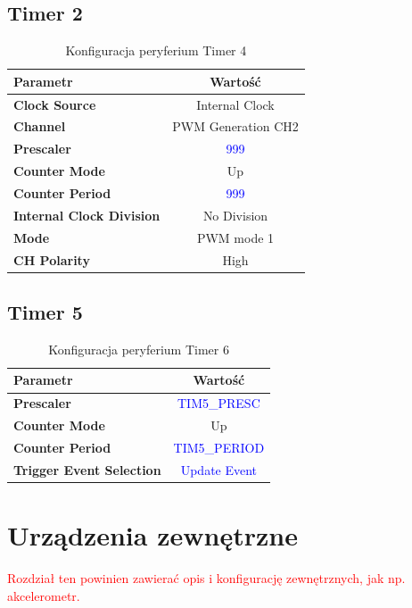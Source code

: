 \documentclass[10pt, a4paper]{article}
\begin{document}
\subsection{Timer 2}

\begin{table}[H]
	\centering
	\begin{tabular}{|l|c|} \hline
		\textbf{Parametr} & Wartość \\
		\hline
		\hline  \textbf{Clock Source}&Internal Clock  \\\hline
		\textbf{Channel} & PWM Generation CH2\\\hline
		\textbf{Prescaler} & \textcolor{blue}{999}\\\hline
		\textbf{Counter Mode} &  Up\\
		\hline
		\textbf{Counter Period}& \textcolor{blue}{999}\\\hline
		\textbf{Internal Clock Division}& No Division\\
		\hline
		\textbf{Mode}& PWM mode 1\\
		\hline
		\textbf{CH Polarity}& High\\
		\hline
	\end{tabular}
	\caption{Konfiguracja peryferium Timer 4}
	\label{tab:Timer4}
\end{table}

\subsection{Timer 5}

\begin{table}[H]
	\centering
	\begin{tabular}{|l|c|} \hline
		\textbf{Parametr} & Wartość \\
		\hline
		\hline
		\textbf{Prescaler} & \textcolor{blue}{TIM5\_PRESC}\\\hline
		\textbf{Counter Mode} &  Up\\
		\hline
		\textbf{Counter Period}& \textcolor{blue}{TIM5\_PERIOD}\\\hline
		\textbf{Trigger Event Selection}& \textcolor{blue}{Update Event}\\
		\hline
	\end{tabular}
	\caption{Konfiguracja peryferium Timer 6}
	\label{tab:Timer6}
\end{table}
\section{Urządzenia zewnętrzne}
\textcolor{red}{Rozdział ten powinien zawierać opis i konfigurację %
	zewnętrznych, jak np. akcelerometr.}
\end{document}
